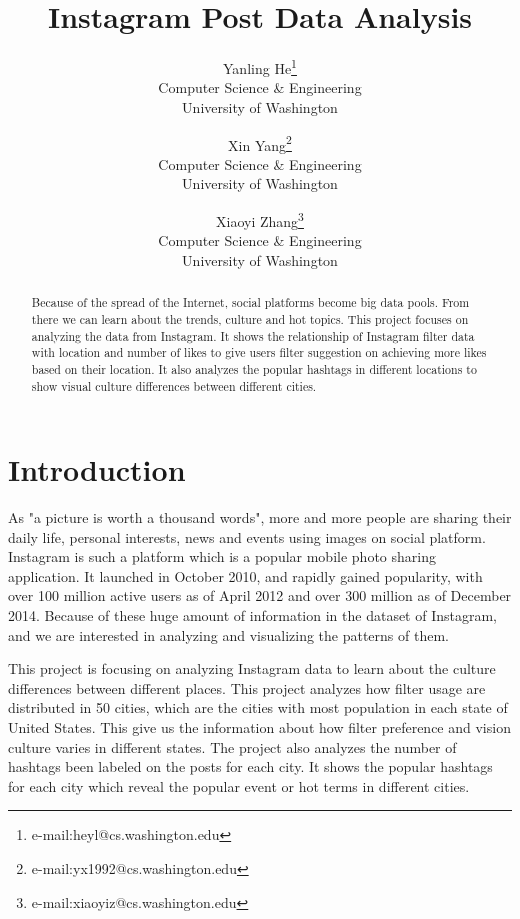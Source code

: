 \documentclass[conference]{acmsiggraph}
\title{Instagram Post Data Analysis}
\author{Yanling He\thanks{e-mail:heyl@cs.washington.edu}\\Computer Science \& Engineering\\University of Washington
\and
Xin Yang\thanks{e-mail:yx1992@cs.washington.edu}\\Computer Science \& Engineering\\University of Washington
\and
Xiaoyi Zhang\thanks{e-mail:xiaoyiz@cs.washington.edu}\\Computer Science \& Engineering\\University of Washington
}
\begin{document}

\maketitle

\begin{abstract}

Because of the spread of the Internet, social platforms become big data pools. From there we can learn about the trends, culture and hot topics.  This project focuses on analyzing the data from Instagram. It shows the relationship of Instagram filter data with location and number of likes to give users filter suggestion on achieving more likes based on their location. It also analyzes the popular hashtags in different locations to show visual culture differences between different cities. 

\end{abstract}

\keywordlist


\TOGlinkslist


\copyrightspace

\section{Introduction}

As "a picture is worth a thousand words", more and more people are sharing their daily life, personal interests, news and events using images on social platform. Instagram is such a platform which is a popular mobile photo sharing application. It launched in October 2010, and rapidly gained popularity, with over 100 million active users as of April 2012 and over 300 million as of December 2014. Because of these huge amount of information in the dataset of Instagram, and we are interested in analyzing and visualizing the patterns of them. 

This project is focusing on analyzing Instagram data to learn about the culture differences between different places. This project analyzes how filter usage are distributed in 50 cities, which are the cities with most population in each state of United States. This give us the information about how filter preference and vision culture varies in different states. The project also analyzes the number of hashtags been labeled on the posts for each city. It shows the popular hashtags for each city which reveal the popular event or hot terms in different cities.
\end{document}
